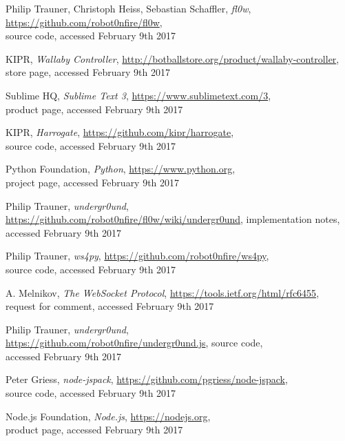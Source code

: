 \documentclass[conference]{IEEEtran}
\begin{document}
\begin{thebibliography}{1}

Philip Trauner, Christoph Heiss, Sebastian Schaffler, \emph{fl0w}, \url{https://github.com/robot0nfire/fl0w},\\ source code,
accessed February 9th 2017

KIPR, \emph{Wallaby Controller},  \url{http://botballstore.org/product/wallaby-controller}, \\ store page, accessed February 9th 2017

Sublime HQ, \emph{Sublime Text 3}, \url{https://www.sublimetext.com/3},\\ product page,
accessed February 9th 2017

KIPR, \emph{Harrogate}, \url{https://github.com/kipr/harrogate},\\ source code,
accessed February 9th 2017

Python Foundation, \emph{Python}, \url{https://www.python.org},\\ project page,
accessed February 9th 2017

Philip Trauner, \emph{undergr0und}, \url{https://github.com/robot0nfire/fl0w/wiki/undergr0und}, implementation notes,
accessed February 9th 2017

Philip Trauner, \emph{ws4py}, \url{https://github.com/robot0nfire/ws4py},\\ source code,
accessed February 9th 2017

A. Melnikov, \emph{The WebSocket Protocol}, \url{https://tools.ietf.org/html/rfc6455},\\ request for comment,
accessed February 9th 2017

Philip Trauner, \emph{undergr0und},\\ \url{https://github.com/robot0nfire/undergr0und.js}, source code, \\accessed February 9th 2017

Peter Griess, \emph{node-jspack}, \url{https://github.com/pgriess/node-jspack},\\ source code,
accessed February 9th 2017

Node.js Foundation, \emph{Node.js}, \url{https://nodejs.org},\\ product page,
accessed February 9th 2017


\end{thebibliography}
\end{document}
